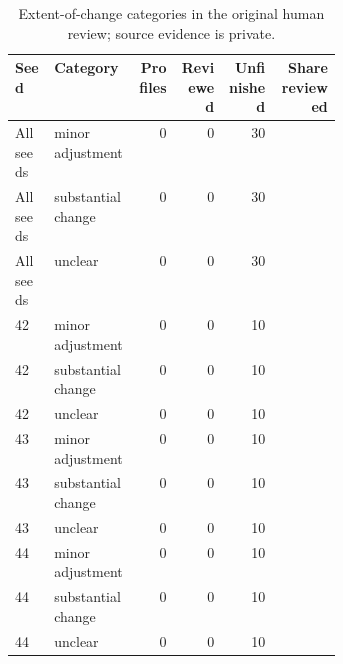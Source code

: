 \begin{table}[htbp!]
\centering
\small
\setlength{\tabcolsep}{3pt}
\renewcommand{\arraystretch}{1.1}
\begin{tabular}{p{0.12\linewidth}p{0.26\linewidth}rrrr}
\hline
Seed & Category & Profiles & Reviewed & Unfinished & Share reviewed \\
\hline
All seeds & minor adjustment & 0 & 0 & 30 & \textemdash{} \\
All seeds & substantial change & 0 & 0 & 30 & \textemdash{} \\
All seeds & unclear & 0 & 0 & 30 & \textemdash{} \\
42 & minor adjustment & 0 & 0 & 10 & \textemdash{} \\
42 & substantial change & 0 & 0 & 10 & \textemdash{} \\
42 & unclear & 0 & 0 & 10 & \textemdash{} \\
43 & minor adjustment & 0 & 0 & 10 & \textemdash{} \\
43 & substantial change & 0 & 0 & 10 & \textemdash{} \\
43 & unclear & 0 & 0 & 10 & \textemdash{} \\
44 & minor adjustment & 0 & 0 & 10 & \textemdash{} \\
44 & substantial change & 0 & 0 & 10 & \textemdash{} \\
44 & unclear & 0 & 0 & 10 & \textemdash{} \\
\hline
\end{tabular}
\caption{Extent-of-change categories in the original human review; source evidence is private.}
\label{chap:results:tab:rq3_profile_review_extent}
\end{table}
